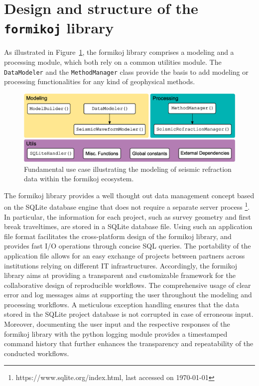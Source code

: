 \documentclass[a4paper,fleqn]{cas-sc}
\begin{document}
\section{Design and structure of the \texttt{formikoj} library}

As illustrated in Figure~\ref{fig:scheme}, the formikoj library comprises a modeling and a processing module, which both rely on a common utilities module. The \texttt{DataModeler} and the \texttt{MethodManager} class provide the basis to add modeling or processing functionalities for any kind of geophysical methods.
\begin{figure}
	\centering
	\includegraphics[width=.75\textwidth]{figures/package_structure}
	\caption{Fundamental use case illustrating the modeling of seismic refraction data within the formikoj ecosystem.}
	\label{fig:scheme}
\end{figure}
The formikoj library provides a well thought out data management concept based on the SQLite database engine that does not require a separate server process \footnote{https://www.sqlite.org/index.html, last accessed on \today}. In particular, the information for each project, such as survey geometry and first break traveltimes, are stored in a SQLite database file. Using such an application file format facilitates the cross-platform design of the formikoj library, and provides fast I/O operations through concise SQL queries. The portability of the application file allows for an easy exchange of projects between partners across institutions relying on different IT infrastructures. Accordingly, the formikoj library aims at providing a transparent and customizable framework for the collaborative design of reproducible workflows. The comprehensive usage of clear error and log messages aims at supporting the user throughout the modeling and processing workflows. A meticulous exception handling ensures that the data stored in the SQLite project database is not corrupted in case of erroneous input. Moreover, documenting the user input and the respective responses of the formikoj library with the python logging module provides a timestamped command history that further enhances the transparency and repeatability of the conducted workflows.
\end{document}
